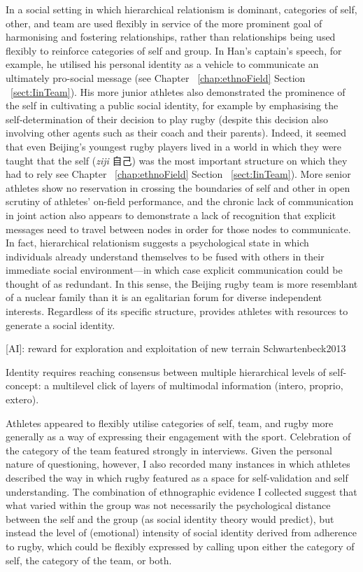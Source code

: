 \begin{CJK}{UTF8}{gbsn}
In a social setting in which hierarchical relationism is dominant, categories of self, other, and team are used flexibly in service of the more prominent goal of harmonising and fostering relationships, rather than relationships being used flexibly to reinforce categories of self and group.  In Han's captain's speech, for example, he utilised his personal identity as a vehicle to communicate an ultimately pro-social message (see Chapter ~\ref{chap:ethnoField} Section ~\ref{sect:IinTeam}).  His more junior athletes also demonstrated the prominence of the self in cultivating a public social identity, for example by emphasising the self-determination of their decision to play rugby (despite this decision also involving other agents such as their coach and their parents).  Indeed, it seemed that even Beijing's youngest rugby players lived in a world in which they were taught that the self (\textit{ziji} 自己) was the most important structure on which they had to rely see Chapter ~\ref{chap:ethnoField} Section ~\ref{sect:IinTeam}). More senior athletes show no reservation in crossing the boundaries of self and other in open scrutiny of athletes' on-field performance, and the chronic lack of communication in joint action also appears to demonstrate a lack of recognition that explicit messages need to travel between nodes in order for those nodes to communicate.  In fact, hierarchical relationism suggests a psychological state in which individuals already understand themselves to be fused with others in their immediate social environment---in which case explicit communication could be thought of as redundant.  In this sense, the Beijing rugby team is more resemblant of a nuclear family than it is an egalitarian forum for diverse independent interests. Regardless of its specific structure, provides athletes with resources to generate a social identity.




[AI]: reward for exploration and exploitation of new terrain Schwartenbeck2013


Identity requires reaching consensus between multiple hierarchical levels of self-concept: a multilevel click of layers of multimodal information (intero, proprio, extero).


Athletes appeared to flexibly utilise categories of self, team, and rugby more generally as a way of expressing their engagement with the sport.  Celebration of the category of the team featured strongly in interviews.  Given the personal nature of questioning, however, I also recorded many instances in which athletes described the way in which rugby featured as a space for self-validation and self understanding. The combination of ethnographic evidence I collected suggest that what varied within the group was not necessarily the psychological distance between the self and the group (as social identity theory would predict), but instead the level of (emotional) intensity of social identity derived from adherence to rugby, which could be flexibly expressed by calling upon either the category of self, the category of the team, or both.








                                                          \end{CJK}
